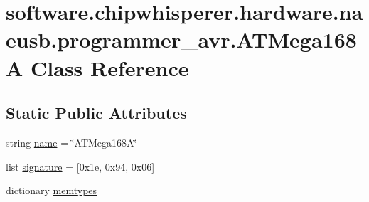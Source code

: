 \hypertarget{classsoftware_1_1chipwhisperer_1_1hardware_1_1naeusb_1_1programmer__avr_1_1ATMega168A}{}\section{software.\+chipwhisperer.\+hardware.\+naeusb.\+programmer\+\_\+avr.\+A\+T\+Mega168\+A Class Reference}
\label{classsoftware_1_1chipwhisperer_1_1hardware_1_1naeusb_1_1programmer__avr_1_1ATMega168A}
\subsection*{Static Public Attributes}
\begin{DoxyCompactItemize}
\item 
string \hyperlink{classsoftware_1_1chipwhisperer_1_1hardware_1_1naeusb_1_1programmer__avr_1_1ATMega168A_a04624fef915ec8416fb29de5e7fb5ddb}{name} = \char`\"{}A\+T\+Mega168\+A\char`\"{}
\item 
list \hyperlink{classsoftware_1_1chipwhisperer_1_1hardware_1_1naeusb_1_1programmer__avr_1_1ATMega168A_a5beeac27a331578ef4fb6f6c54d17add}{signature} = \mbox{[}0x1e, 0x94, 0x06\mbox{]}
\item 
dictionary \hyperlink{classsoftware_1_1chipwhisperer_1_1hardware_1_1naeusb_1_1programmer__avr_1_1ATMega168A_af0fcafa37181966de56affefb138dc4e}{memtypes}
\end{DoxyCompactItemize}


